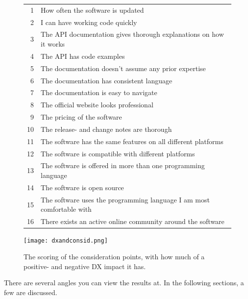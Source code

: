 \documentclass{cslthse-msc}
\begin{document}
    \begin{figure}[H]
        \centering
        \begin{tabular}{r l}
            \hline
            1    & How often the software is updated    \\
            2    & I can have working code quickly  \\
            3    & The API documentation gives thorough explanations on how it works    \\
            4    & The API has code examples    \\
            5    & The documentation doesn't assume any prior expertise \\
            6    & The documentation has consistent language    \\
            7    & The documentation is easy to navigate    \\
            8    & The official website looks professional  \\
            9    & The pricing of the software  \\
            10    &  The release- and change notes are thorough \\
            11   &  The software has the same features on all different platforms   \\
            12    &  The software is compatible with different platforms    \\
            13  &  The software is offered in more than one programming language    \\
            14    &  The software is open source    \\
            15    &  The software uses the programming language I am most comfortable with  \\
            16    &  There exists an active online community around the software    \\ \hline
        \end{tabular}
        \hspace*{-0.01\textwidth}\texttt{[image: dxandconsid.png]}
        \caption{The scoring of the consideration points, with how much of a positive- and negative DX impact it has.}
        \label{fig:dxandcosnid}
    \end{figure}

    There are several angles you can view the results at. In the following sections, a few are discussed.
\end{document}
